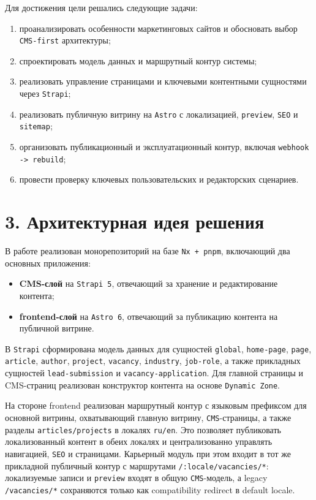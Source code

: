 \documentclass[12pt,a4paper]{article}
\begin{document}
Для достижения цели решались следующие задачи:
\begin{enumerate}
  \item проанализировать особенности маркетинговых сайтов и обосновать выбор
  \texttt{CMS-first} архитектуры;
  \item спроектировать модель данных и маршрутный контур системы;
  \item реализовать управление страницами и ключевыми контентными сущностями через
  \texttt{Strapi};
  \item реализовать публичную витрину на \texttt{Astro} с локализацией, \texttt{preview},
  \texttt{SEO} и \texttt{sitemap};
  \item организовать публикационный и эксплуатационный контур, включая
  \texttt{webhook -> rebuild};
  \item провести проверку ключевых пользовательских и редакторских сценариев.
\end{enumerate}

\section*{3. Архитектурная идея решения}

В работе реализован монорепозиторий на базе \texttt{Nx + pnpm}, включающий два основных
приложения:
\begin{itemize}
  \item \textbf{CMS-слой} на \texttt{Strapi 5}, отвечающий за хранение и редактирование
  контента;
  \item \textbf{frontend-слой} на \texttt{Astro 6}, отвечающий за публикацию контента на
  публичной витрине.
\end{itemize}

В \texttt{Strapi} сформирована модель данных для сущностей \texttt{global},
\texttt{home-page}, \texttt{page}, \texttt{article}, \texttt{author}, \texttt{project},
\texttt{vacancy}, \texttt{industry}, \texttt{job-role}, а также прикладных сущностей
\texttt{lead-submission} и \texttt{vacancy-application}. Для главной страницы и CMS-страниц
реализован конструктор контента на основе \texttt{Dynamic Zone}.

На стороне frontend реализован маршрутный контур с языковым префиксом для основной
витрины, охватывающий главную витрину, \texttt{CMS}-страницы, а также разделы
\texttt{articles/projects} в локалях \texttt{ru/en}. Это позволяет публиковать
локализованный контент в обеих локалях и централизованно управлять навигацией,
\texttt{SEO} и страницами. Карьерный
модуль при этом входит в тот же прикладной публичный контур с маршрутами
\texttt{/:locale/vacancies/*}: локализуемые записи и \texttt{preview} входят в общую
\texttt{CMS}-модель, а legacy \texttt{/vacancies/*} сохраняются только как compatibility
redirect в default locale.
\end{document}
